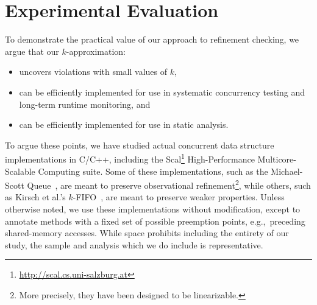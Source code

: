 \section{Experimental Evaluation}
\label{sec:exp}

To demonstrate the practical value of our approach to refinement checking,
we argue that our $k$-approximation:
\begin{itemize}

  \item uncovers violations with small values of $k$,

  \item can be efficiently implemented for use in systematic concurrency
  testing and long-term runtime monitoring, and
  
  \item can be efficiently implemented for use in static analysis.

\end{itemize}

To argue these points, we have studied actual concurrent data structure
implementations in C/C++, including the
Scal\footnote{\url{http://scal.cs.uni-salzburg.at}} High-Performance
Multicore-Scalable Computing suite. Some of these implementations, such as the
Michael-Scott Queue~\cite{conf/podc/MichaelS96}, are meant to preserve
observational refinement\footnote{More precisely, they have been designed to be
linearizable.}, while others, such as Kirsch et al.'s
$k$-FIFO~\cite{conf/pact/KirschLP13}, are meant to preserve weaker properties.
Unless otherwise noted, we use these implementations without modification,
except to annotate methods with a fixed set of possible preemption points,
e.g.,~preceding shared-memory accesses. While space prohibits including the
entirety of our study, the sample and analysis which we do include is
representative.

